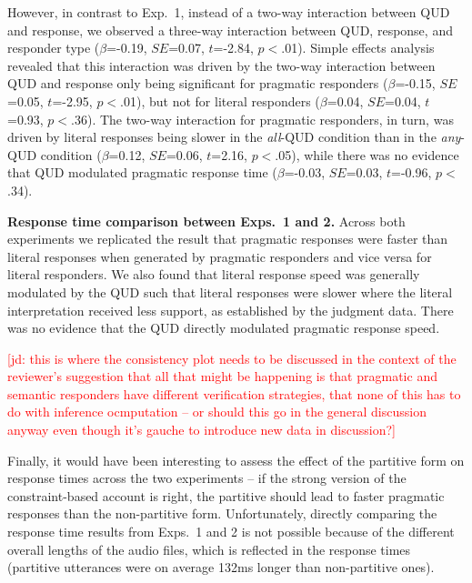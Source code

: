 \documentclass[10pt,letterpaper]{article}
\newcommand{\jd}[1]{\textcolor{Red}{[jd: #1]}}
\begin{document}
However, in contrast to Exp.~1, instead of a two-way interaction between QUD and response, we observed a three-way interaction between QUD, response, and responder type ($\beta$=-0.19, $SE$=0.07, $t$=-2.84, $p$$<$.01). Simple effects analysis revealed that this interaction was driven by the two-way interaction between QUD and response only being significant for pragmatic responders ($\beta$=-0.15, $SE$=0.05, $t$=-2.95, $p$$<$.01), but not for literal responders ($\beta$=0.04, $SE$=0.04, $t$=0.93, $p$$<$.36).  The two-way interaction for pragmatic responders, in turn, was driven by literal responses being slower in the \emph{all}-QUD condition than in the \emph{any}-QUD condition  ($\beta$=0.12, $SE$=0.06, $t$=2.16, $p$$<$.05), while there was no evidence that QUD modulated pragmatic response time  ($\beta$=-0.03, $SE$=0.03, $t$=-0.96, $p$$<$.34).

\noindent \textbf{Response time comparison between Exps.~1 and 2.} Across both experiments we replicated the result that pragmatic responses were faster than literal responses when generated by pragmatic responders and vice versa for literal responders. 
We also found that literal response speed was generally modulated by the QUD such that literal responses were slower where the literal interpretation received less support, as established by the judgment data. There was no evidence that the QUD directly modulated pragmatic response speed.

\jd{this is where the consistency plot needs to be discussed in the context of the reviewer's suggestion that all that might be happening is that pragmatic and semantic responders have different verification strategies, that none of this has to do with inference ocmputation -- or should this go in the general discussion anyway even though it's gauche to introduce new data in discussion?}

Finally, it would have been interesting to assess the effect of the partitive form on response times across the two experiments -- if the strong version of the constraint-based account is right, the partitive should lead to faster pragmatic responses than the non-partitive form. Unfortunately, directly comparing the response time results from Exps.~1 and 2 is not  possible because of the different overall lengths of the audio files, which is reflected in the response times (partitive utterances were on average 132ms longer than non-partitive ones).
\end{document}
